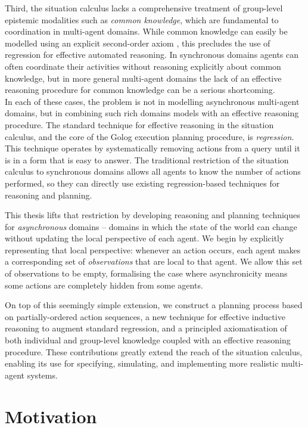 Third, the situation calculus lacks a comprehensive treatment of group-level
epistemic modalities such as \emph{common knowledge}, which are fundamental
to coordination in multi-agent domains. While common knowledge can
easily be modelled using an explicit second-order axiom , this precludes
the use of regression for effective automated reasoning. In synchronous
domains agents can often coordinate their activities without reasoning
explicitly about common knowledge, but in more general multi-agent
domains the lack of an effective reasoning procedure for common knowledge
can be a serious shortcoming.\\


In each of these cases, the problem is not in modelling asynchronous
multi-agent domains, but in combining such rich domains models with
an effective reasoning procedure. The standard technique for effective
reasoning in the situation calculus, and the core of the Golog execution
planning procedure, is \emph{regression.} This technique operates
by systematically removing actions from a query until it is in a form
that is easy to answer. The traditional restriction of the situation
calculus to synchronous domains allows all agents to know the number
of actions performed, so they can directly use existing regression-based
techniques for reasoning and planning.

This thesis lifts that restriction by developing reasoning and planning
techniques for \emph{asynchronous} domains -- domains in which the
state of the world can change without updating the local perspective
of each agent. We begin by explicitly representing that local perspective:
whenever an action occurs, each agent makes a corresponding set of
\emph{observations} that are local to that agent. We allow this set
of observations to be empty, formalising the case where asynchronicity
means some actions are completely hidden from some agents.

On top of this seemingly simple extension, we construct a planning
process based on partially-ordered action sequences, a new technique
for effective inductive reasoning to augment standard regression,
and a principled axiomatisation of both individual and group-level
knowledge coupled with an effective reasoning procedure. These contributions
greatly extend the reach of the situation calculus, enabling its use
for specifying, simulating, and implementing more realistic multi-agent
systems.


\section{Motivation}

